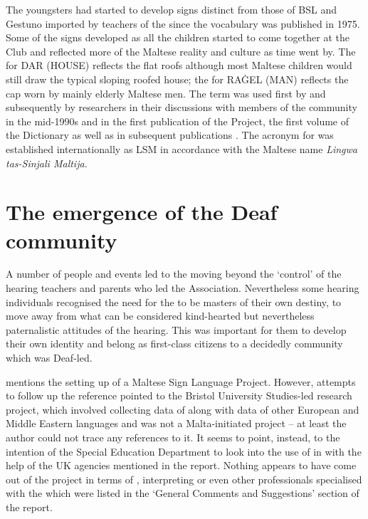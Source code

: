 \documentclass[output=paper]{langsci/langscibook}
\begin{document}
The  youngsters had started to develop signs distinct from those
of BSL and Gestuno imported by teachers of the  since the
vocabulary was published in 1975.  Some of the signs developed as all
the  children started to come together at the  Club and
reflected more of the Maltese reality and culture as time went by.
The  for DAR (HOUSE) reflects the flat roofs although most Maltese
children would still draw the typical sloping roofed house; the 
for RA\.GEL (MAN) reflects the cap worn by mainly elderly Maltese
men. The term  was used first by
\citet[7]{lj86} and subsequently by researchers in
their discussions with members of the  community in the mid-1990s
and in the first publication of the  Project, the
first volume of the Dictionary \citep{a03} as
well as in subsequent publications \citep{a09,a05}.  The acronym for  was established
internationally as LSM in accordance with the Maltese name
\textit{Lingwa tas-Sinjali Maltija.}

\section{The emergence of the Deaf community}

A number of people and events led to the  moving beyond the
‘control’ of the hearing teachers and parents who led the Association.
Nevertheless some hearing individuals recognised the need for the 
to be masters of their own destiny, to move away from what can be
considered kind-hearted but nevertheless paternalistic attitudes of
the hearing.  This was important for them to develop their own
identity and belong as first-class citizens to a decidedly 
community which was Deaf-led.

\citet{ba91} mentions the setting up of a Maltese Sign
Language Project.  However, attempts to follow up the reference
pointed to the Bristol University  Studies-led research project,
which involved collecting data of  along with
data of other European and Middle Eastern  languages and was not a
Malta-initiated project – at least the author could not trace any
references to it.  It seems to point, instead, to the intention of the
Special Education Department to look into the use of  in
 with the help of the UK agencies mentioned in the
\citet{lj86} report.  Nothing appears to have come
out of the project in terms of , 
interpreting or even other professionals specialised with the 
which were listed in the ‘General Comments and Suggestions’ section of
the report.
\end{document}
